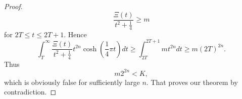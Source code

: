 \begin{proof}
\begin{equation*}
	\frac{\Xi(t)}{t^2 + \frac{1}{4}} \geq m
\end{equation*}
	for $2T \leq t \leq 2T + 1$. Hence
\begin{equation*}
	\int _T ^{\infty} \frac{\Xi(t)}{t^2 + \frac{1}{4}} t^{2n} \cosh(\frac{1}{4} \pi t) dt \geq \int _{2T} ^{2T + 1} mt^{2n} dt \geq m(2T)^{2n}.
\end{equation*}
	Thus
\begin{equation*}
	m2^{2n} < K,
\end{equation*}
	which is obviously false for sufficiently large $n$. That proves our theorem by contradiction.
\end{proof}